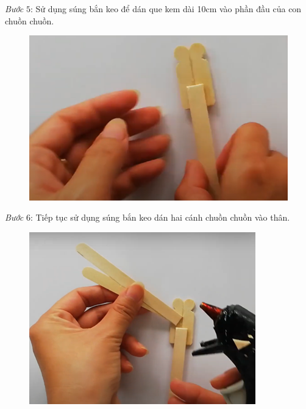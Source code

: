\begin{multicols}{2}
	\textit{Bước} $5$: Sử dụng súng bắn keo để dán que kem dài 10cm vào phần đầu của con chuồn chuồn.
	\begin{figure}[H]
		\vspace*{-5pt}
		\centering
		\captionsetup{labelformat= empty, justification=centering}
		\includegraphics[width= 1\linewidth]{55}
		\vspace*{-10pt}
	\end{figure}
	\textit{Bước} $6$: Tiếp tục sử dụng súng bắn keo dán hai cánh chuồn chuồn vào thân.
	\begin{figure}[H]
		\vspace*{-5pt}
		\centering
		\captionsetup{labelformat= empty, justification=centering}
		\includegraphics[width= 1\linewidth]{56}

\end{figure}
\end{multicols}
